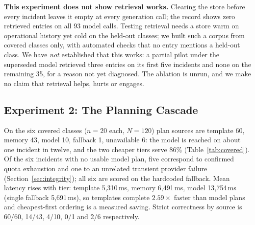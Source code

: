 \documentclass[conference]{IEEEtran}
\begin{document}
\label{sec:notshown}
\textbf{This experiment does not show retrieval works.} Clearing the
store before every incident leaves it empty at every generation call;
the record shows zero retrieved entries on all 93 model calls. Testing
retrieval needs a store warm on operational history yet cold on the
held-out classes; we built such a corpus from covered classes only, with
automated checks that no entry mentions a held-out class. We have
\emph{not} established that this works: a partial pilot under the
superseded model retrieved three entries on its first five incidents and
none on the remaining 35, for a reason not yet diagnosed. The ablation is
unrun, and we make no claim that retrieval helps, hurts or engages.

\subsection{Experiment 2: The Planning Cascade}
\label{sec:cascade}
On the six covered classes ($n{=}20$ each, $N{=}120$) plan sources are
template 60, memory 43, model 10, fallback 1, unavailable 6: the model
is reached on about one incident in twelve, and the two cheaper tiers
serve 86\% (Table~\ref{tab:covered}). Of the six incidents with no usable model plan, five
correspond to confirmed quota exhaustion and one to an unrelated
transient provider failure (Section~\ref{sec:integrity}); all six are
scored on the hardcoded fallback. Mean latency rises with tier: template
5,310\,ms, memory 6,491\,ms, model 13,754\,ms (single fallback
5,691\,ms), so templates complete $2.59\times$ faster than model plans
and cheapest-first ordering is a measured saving. Strict correctness by
source is 60/60, 14/43, 4/10, 0/1 and 2/6 respectively.
\end{document}
